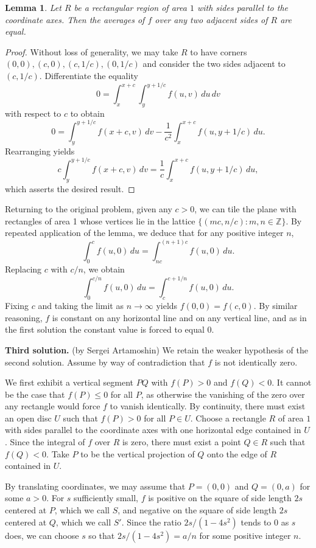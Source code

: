 \documentclass[amssymb,twocolumn,pra,10pt,aps]{revtex4-1}
\newtheorem*{lemma*}{Lemma}
\newcommand{\ZZ}{\mathbb{Z}}
\begin{document}
\begin{itemize}
\setcounter{lemma}{0}
\begin{lemma*}
Let $R$ be a rectangular region of area $1$ with sides parallel to the coordinate axes.
Then the averages of $f$ over any two adjacent sides of $R$ are equal.
\end{lemma*}
\begin{proof}
Without loss of generality, we may take $R$ to have corners $(0, 0), (c,0), (c,1/c), (0,1/c)$ and consider
the two sides adjacent to $(c,1/c)$. Differentiate the equality
\[
0 = \int_x^{x+c} \int_y^{y+1/c} f(u,v)\,du\,dv
\]
with respect to $c$ to obtain
\[
0 = \int_y^{y+1/c} f(x+c,v)\,dv - \frac{1}{c^2} \int_x^{x+c} f(u,y+1/c)\,du.
\]
Rearranging yields
\[
c \int_y^{y+1/c} f(x+c,v)\,dv = \frac{1}{c} \int_x^{x+c} f(u,y+1/c)\,du,
\]
which asserts the desired result.
\end{proof}

Returning to the original problem, given any $c>0$, we can tile the plane with rectangles of area 1 whose
vertices lie in the lattice $\{(mc, n/c): m,n \in \ZZ\}$. By repeated application of the lemma,
we deduce that for any positive integer $n$,
\[
\int_0^c f(u,0)\,du = \int_{nc}^{(n+1)c} f(u,0)\,du.
\]
Replacing $c$ with $c/n$, we obtain
\[
\int_0^{c/n} f(u,0)\,du = \int_{c}^{c+1/n} f(u,0)\,du.
\]
Fixing $c$ and taking the limit as $n \to \infty$ yields $f(0,0) = f(c,0)$. By similar reasoning,
$f$ is constant on any horizontal line and on any vertical line, and as in the first solution the constant
value is forced to equal 0.

\noindent
\textbf{Third solution.} (by Sergei Artamoshin) We retain the weaker hypothesis of the second solution. Assume by way of contradiction that $f$ is not identically zero.

We first exhibit a vertical segment $PQ$ with $f(P) > 0$ and $f(Q) < 0$.
It cannot be the case that $f(P) \leq 0$ for all $P$, as otherwise the vanishing of the zero over any rectangle would force $f$ to vanish identically. By continuity, there must exist an open disc $U$ such that $f(P) > 0$ for all $P \in U$. Choose a rectangle $R$ of area $1$ with sides parallel to the coordinate axes with one horizontal edge contained in $U$. Since the integral of $f$ over $R$ is zero, there must exist a point $Q \in R$ such that $f(Q) < 0$. Take $P$ to be the vertical projection of $Q$ onto the edge of $R$ contained in $U$.

By translating coordinates, we may assume that $P = (0,0)$ and
$Q = (0,a)$ for some $a>0$.
For $s$ sufficiently small, $f$ is positive on the square of side length $2s$ centered at $P$, which we call $S$, and negative on the square of side length $2s$ centered at $Q$, which we call $S'$. Since the ratio $2s/(1-4s^2)$ tends to 0 as $s$ does, we can choose $s$ so that
$2s/(1-4s^2) = a/n$ for some positive integer $n$.


\end{itemize}
\end{document}
